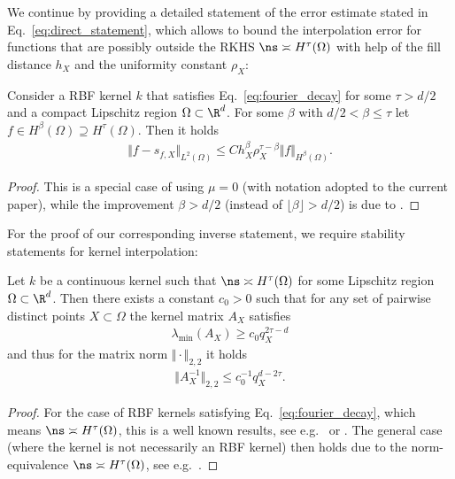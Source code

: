 \documentclass[a4paper, 10pt]{article}
\begin{document}
%
%

%


We continue by providing a detailed statement of the error estimate stated in Eq.~\eqref{eq:direct_statement},
which allows to bound the interpolation error for functions that are possibly outside the RKHS $\ns \asymp H^\tau(\Omega)$
with help of the fill distance $h_X$ and the uniformity constant $\rho_X$:

\begin{theorem}
\label{th:error_estimate}
Consider a RBF kernel $k$ that satisfies Eq.\ \eqref{eq:fourier_decay} for some $\tau > d/2$ and a compact Lipschitz region $\Omega \subset \R^d$.
For some $\beta$ with $d/2 < \beta \leq \tau$ let $f \in H^\beta(\Omega) \supseteq H^\tau(\Omega)$.
Then it holds
\begin{align*}
\Vert f - s_{f,X} \Vert_{L^2(\Omega)} \leq C h_{X}^\beta \rho_{X}^{\tau-\beta} \Vert f \Vert_{H^\beta(\Omega)}.
\end{align*}
\end{theorem}

\begin{proof}
This is a special case of \cite[Theorem 4.2]{narcowich2006sobolev} using $\mu = 0$ (with notation adopted to the current paper),
while the improvement $\beta > d/2$ (instead of $\lfloor \beta \rfloor > d/2$) is due to \cite[Theorem 4.1]{arcangeli2007extension}.
\end{proof}

For the proof of our corresponding inverse statement, we require stability statements for kernel interpolation:

\begin{theorem}
\label{th:stability_statement}
%
Let $k$ be a continuous kernel such that $\ns \asymp H^\tau(\Omega)$ for some Lipschitz region $\Omega \subset \R^d$.
Then there exists a constant $c_0 > 0$ such that for any set of pairwise distinct points $X \subset \Omega$ the kernel matrix $A_X$ satisfies
\begin{align*}
\lambda_{\min}(A_{X}) \geq c_0 q_{X}^{2\tau - d}
\end{align*}
and thus for the matrix norm $\Vert \cdot \Vert_{2, 2}$ it holds
\begin{align*}
\Vert A_X^{-1} \Vert_{2,2} \leq c_0^{-1} q_{X}^{d - 2\tau}.
\end{align*}
\end{theorem}

\begin{proof}
For the case of RBF kernels satisfying Eq.~\eqref{eq:fourier_decay}, which means $\ns \asymp H^\tau(\Omega)$, this is a well known results, see e.g.\ \cite{schaback1995error} or \cite[Chapter 12.2]{wendland2005scattered}.
The general case (where the kernel is not necessarily an RBF kernel) then holds due to the norm-equivalence $\ns \asymp H^\tau(\Omega)$, see e.g.~\cite[Section F.2]{haas2023mind}.
%
\end{proof}
\end{document}
